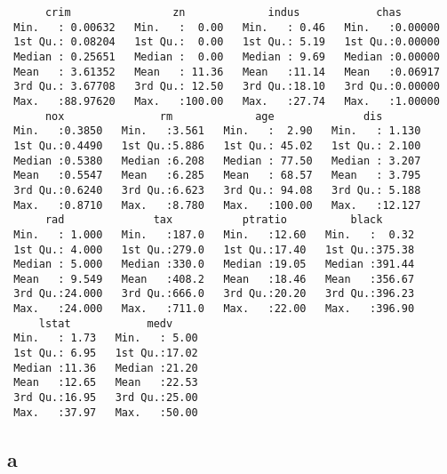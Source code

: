 \documentclass[11pt]{article}
\begin{document}
    
    \begin{verbatim}
      crim                zn             indus            chas        
 Min.   : 0.00632   Min.   :  0.00   Min.   : 0.46   Min.   :0.00000  
 1st Qu.: 0.08204   1st Qu.:  0.00   1st Qu.: 5.19   1st Qu.:0.00000  
 Median : 0.25651   Median :  0.00   Median : 9.69   Median :0.00000  
 Mean   : 3.61352   Mean   : 11.36   Mean   :11.14   Mean   :0.06917  
 3rd Qu.: 3.67708   3rd Qu.: 12.50   3rd Qu.:18.10   3rd Qu.:0.00000  
 Max.   :88.97620   Max.   :100.00   Max.   :27.74   Max.   :1.00000  
      nox               rm             age              dis        
 Min.   :0.3850   Min.   :3.561   Min.   :  2.90   Min.   : 1.130  
 1st Qu.:0.4490   1st Qu.:5.886   1st Qu.: 45.02   1st Qu.: 2.100  
 Median :0.5380   Median :6.208   Median : 77.50   Median : 3.207  
 Mean   :0.5547   Mean   :6.285   Mean   : 68.57   Mean   : 3.795  
 3rd Qu.:0.6240   3rd Qu.:6.623   3rd Qu.: 94.08   3rd Qu.: 5.188  
 Max.   :0.8710   Max.   :8.780   Max.   :100.00   Max.   :12.127  
      rad              tax           ptratio          black       
 Min.   : 1.000   Min.   :187.0   Min.   :12.60   Min.   :  0.32  
 1st Qu.: 4.000   1st Qu.:279.0   1st Qu.:17.40   1st Qu.:375.38  
 Median : 5.000   Median :330.0   Median :19.05   Median :391.44  
 Mean   : 9.549   Mean   :408.2   Mean   :18.46   Mean   :356.67  
 3rd Qu.:24.000   3rd Qu.:666.0   3rd Qu.:20.20   3rd Qu.:396.23  
 Max.   :24.000   Max.   :711.0   Max.   :22.00   Max.   :396.90  
     lstat            medv      
 Min.   : 1.73   Min.   : 5.00  
 1st Qu.: 6.95   1st Qu.:17.02  
 Median :11.36   Median :21.20  
 Mean   :12.65   Mean   :22.53  
 3rd Qu.:16.95   3rd Qu.:25.00  
 Max.   :37.97   Max.   :50.00  
    \end{verbatim}

    
    \hypertarget{a}{%
\subsection{a}\label{a}}


    
    
    
    
\end{document}
